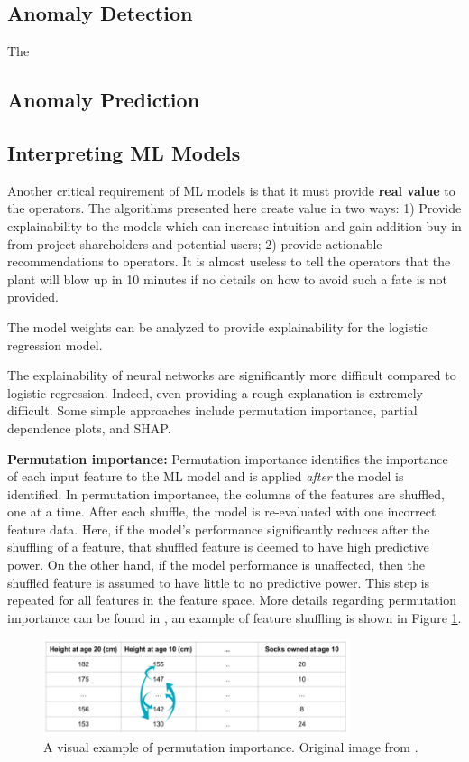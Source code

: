 \subsection{Anomaly Detection}
The 


\subsection{Anomaly Prediction}


\subsection{Interpreting ML Models}
Another critical requirement of ML models is that it must provide \textbf{real value} to the operators.  The algorithms presented here create value in two ways: 1) Provide explainability to the models which can increase intuition and gain addition buy-in from project shareholders and potential users; 2) provide actionable recommendations to operators.  It is almost useless to tell the operators that the plant will blow up in 10 minutes if no details on how to avoid such a fate is not provided.

The model weights can be analyzed to provide explainability for the logistic regression model.

The explainability of neural networks are significantly more difficult compared to logistic regression.  Indeed, even providing a rough explanation is extremely difficult. Some simple approaches include permutation importance, partial dependence plots, and SHAP.  

\textbf{Permutation importance:} Permutation importance identifies the importance of each input feature to the ML model and is applied \textit{after} the model is identified.  In permutation importance, the columns of the features are shuffled, one at a time.  After each shuffle, the model is re-evaluated with  one incorrect feature data.  Here, if the model's performance significantly reduces after the shuffling of a feature, that shuffled feature is deemed to have high predictive power.  On the other hand, if the model performance is unaffected, then the shuffled feature is assumed to have little to no predictive power. This step is repeated for all features in the feature space. More details regarding permutation importance can be found in \cite{perm_imp}, an example of feature shuffling is shown in Figure \ref{fig:03perm_imp}.
\begin{figure}[H]
    \centering
    \includegraphics[width=0.8\textwidth]{images/ch3/perm_imp.jpeg}
    \caption{A visual example of permutation importance. Original image from \cite{img_perm_imp}.}
    \label{fig:03perm_imp}
\end{figure}


